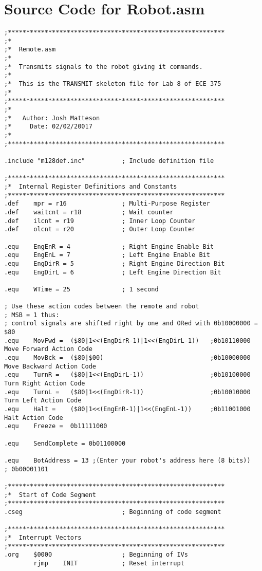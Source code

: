 \documentclass[12pt,letterpaper]{article}
\begin{document}
\section{Source Code for Robot.asm}
\scriptsize{\begin{verbatim}
;***********************************************************
;*
;*	Remote.asm
;*
;*	Transmits signals to the robot giving it commands.
;*
;*	This is the TRANSMIT skeleton file for Lab 8 of ECE 375
;*
;***********************************************************
;*
;*	 Author: Josh Matteson
;*	   Date: 02/02/20017
;*
;***********************************************************

.include "m128def.inc"			; Include definition file

;***********************************************************
;*	Internal Register Definitions and Constants
;***********************************************************
.def	mpr = r16				; Multi-Purpose Register
.def 	waitcnt = r18			; Wait counter
.def	ilcnt = r19				; Inner Loop Counter
.def	olcnt = r20				; Outer Loop Counter

.equ	EngEnR = 4				; Right Engine Enable Bit
.equ	EngEnL = 7				; Left Engine Enable Bit
.equ	EngDirR = 5				; Right Engine Direction Bit
.equ	EngDirL = 6				; Left Engine Direction Bit

.equ 	WTime = 25				; 1 second

; Use these action codes between the remote and robot
; MSB = 1 thus:
; control signals are shifted right by one and ORed with 0b10000000 = $80
.equ	MovFwd =  ($80|1<<(EngDirR-1)|1<<(EngDirL-1))	;0b10110000 Move Forward Action Code
.equ	MovBck =  ($80|$00)								;0b10000000 Move Backward Action Code
.equ	TurnR =   ($80|1<<(EngDirL-1))					;0b10100000 Turn Right Action Code
.equ	TurnL =   ($80|1<<(EngDirR-1))					;0b10010000 Turn Left Action Code
.equ	Halt =    ($80|1<<(EngEnR-1)|1<<(EngEnL-1))		;0b11001000 Halt Action Code
.equ	Freeze =  0b11111000

.equ	SendComplete = 0b01100000

.equ	BotAddress = 13 ;(Enter your robot's address here (8 bits))
; 0b00001101

;***********************************************************
;*	Start of Code Segment
;***********************************************************
.cseg							; Beginning of code segment

;***********************************************************
;*	Interrupt Vectors
;***********************************************************
.org	$0000					; Beginning of IVs
		rjmp 	INIT			; Reset interrupt


\end{verbatim}}
\end{document}
